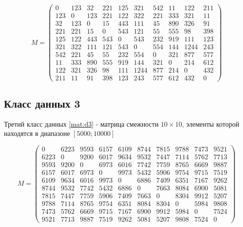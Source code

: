 \documentclass[a4paper,oneside,14pt]{extreport}
\begin{document}
\begin{equation}
\label{mat:d2}
M = 
\begin{pmatrix} 
0& 123& 32& 221& 125& 321& 542& 11& 122& 211\\ 
123& 0& 123& 221& 122& 322& 221& 333& 321& 11\\ 
32& 123& 0& 15& 443& 111& 45& 890& 326& 91\\ 
221& 221& 15& 0& 543& 121& 55& 555& 98& 398\\ 
125& 122& 443& 543& 0& 543& 232& 919& 111& 123\\
321& 322& 111& 121& 543& 0& 554& 144& 1244& 243\\ 
542& 221& 45& 55& 232& 554& 0& 321& 877& 577\\ 
11& 333& 890& 555& 919& 144& 321& 0& 214& 612\\ 
122& 321& 326& 98& 111& 1244& 877& 214& 0& 432\\
211& 11& 91& 398& 123& 243& 577& 612& 432& 0
\end{pmatrix}
\end{equation}

\subsection*{Класс данных 3}
Третий класс данных \ref{mat:d3} - матрица смежности $10\times10$, элементы которой находятся в диапазоне $[5000;10000]$

\begin{equation}
\label{mat:d3}
M = 
\begin{pmatrix} 
0& 6223& 9593& 6157& 6109& 8744& 7815& 9788& 7473& 9521\\
6223& 0& 9200& 6017& 9634& 9532& 7447& 7114& 5762& 7713\\
9593& 9200& 0& 6973& 6016& 7742& 7759& 8765& 6669& 9887\\
6157& 6017& 6973& 0& 9973& 5432& 5906& 9754& 9715& 7519\\
6109& 9634& 6016& 9973& 0& 6886& 7409& 6351& 7167& 9262\\
8744& 9532& 7742& 5432& 6886& 0& 7663& 8084& 6900& 5081\\
7815& 7447& 7759& 5906& 7409& 7663& 0& 8304& 9912& 5207\\
9788& 7114& 8765& 9754& 6351& 8084& 8304& 0& 5984& 9808\\
7473& 5762& 6669& 9715& 7167& 6900& 9912& 5984& 0& 7524\\
9521& 7713& 9887& 7519& 9262& 5081& 5207& 9808& 7524& 0
\end{pmatrix}
\end{equation}
\end{document}
